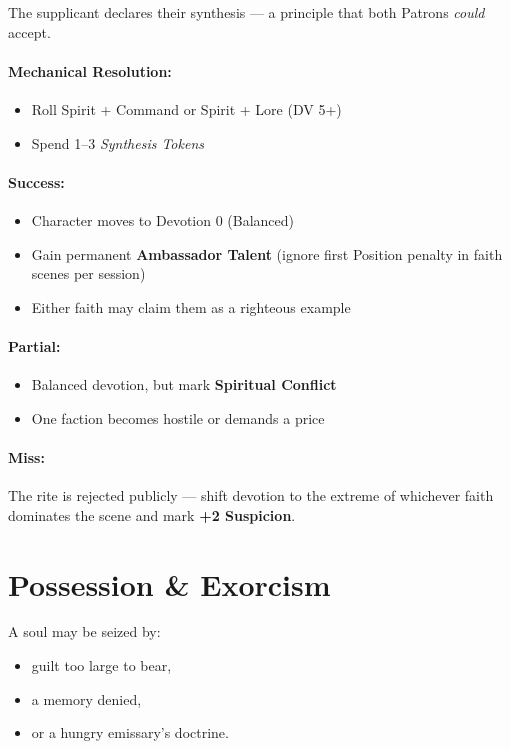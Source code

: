 \documentclass[11pt]{article}
\begin{document}
The supplicant declares their synthesis --- a principle that both Patrons
\textit{could} accept.

\paragraph{Mechanical Resolution:}
\begin{itemize}
  \item Roll Spirit + Command or Spirit + Lore (DV 5+)
  \item Spend 1--3 \emph{Synthesis Tokens}
\end{itemize}

\paragraph{Success:}
\begin{itemize}
  \item Character moves to Devotion 0 (Balanced)
  \item Gain permanent \textbf{Ambassador Talent}
        (ignore first Position penalty in faith scenes per session)
  \item Either faith may claim them as a righteous example
\end{itemize}

\paragraph{Partial:}
\begin{itemize}
  \item Balanced devotion, but mark \textbf{Spiritual Conflict}
  \item One faction becomes hostile or demands a price
\end{itemize}

\paragraph{Miss:}
The rite is rejected publicly --- shift devotion to the extreme of whichever
faith dominates the scene and mark \textbf{+2 Suspicion}.

\section*{Possession \& Exorcism}


A soul may be seized by:
\begin{itemize}
  \item guilt too large to bear,
  \item a memory denied,
  \item or a hungry emissary's doctrine.
\end{itemize}
\end{document}
